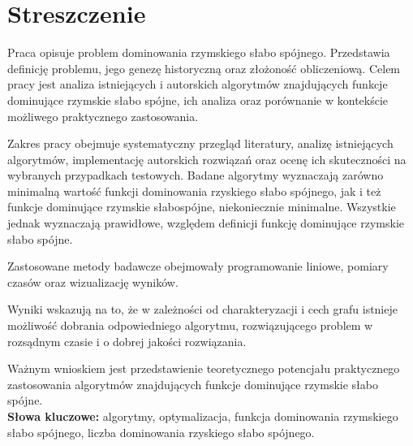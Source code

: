 \chapter*{Streszczenie}
Praca opisuje problem dominowania rzymskiego słabo spójnego. Przedstawia definicję problemu, jego genezę historyczną oraz złożoność obliczeniową. Celem pracy jest analiza istniejących i autorskich algorytmów znajdujących funkcje dominujące rzymskie słabo spójne, ich analiza oraz porównanie w kontekście możliwego praktycznego zastosowania.

Zakres pracy obejmuje systematyczny przegląd literatury, analizę istniejących algorytmów, implementację autorskich rozwiązań oraz ocenę ich skuteczności na wybranych przypadkach testowych. Badane algorytmy wyznaczają zarówno minimalną wartość funkcji dominowania rzyskiego słabo spójnego, jak i też funkcje dominujące rzymskie słabospójne, niekoniecznie minimalne. Wszystkie jednak wyznaczają prawidłowe, względem definicji funkcję dominujące rzymskie słabo spójne.

Zastosowane metody badawcze obejmowały programowanie liniowe, pomiary czasów oraz wizualizację wyników.

Wyniki wskazują na to, że w zależności od charakteryzacji i cech grafu istnieje możliwość dobrania odpowiedniego algorytmu, rozwiązującego problem w rozsądnym czasie i o dobrej jakości rozwiązania.

Ważnym wnioskiem jest przedstawienie teoretycznego potencjału praktycznego zastosowania algorytmów znajdujących funkcje dominujące rzymskie słabo spójne.\\

\textbf{Słowa kluczowe:} algorytmy, optymalizacja, funkcja dominowania rzymskiego słabo spójnego, liczba dominowania rzyskiego słabo spójnego.
